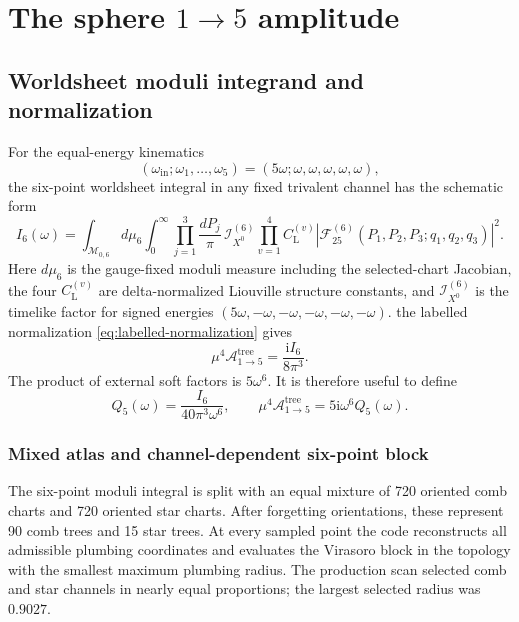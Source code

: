 \documentclass[11pt]{article}
\newcommand{\ii}{\mathrm{i}}
\newcommand{\A}{\mathcal{A}}
\begin{document}
\section{The sphere \texorpdfstring{$1\to5$}{1 to 5} amplitude}
\label{sec:one-to-five}

\subsection{Worldsheet moduli integrand and normalization}

For the equal-energy kinematics
\begin{equation}
  (\omega_{\mathrm{in}};\omega_1,\ldots,\omega_5)
  =(5\omega;\omega,\omega,\omega,\omega,\omega),
\end{equation}
the six-point worldsheet integral in any fixed trivalent channel has the
schematic form
\begin{equation}
  I_6(\omega)=\int_{\mathcal M_{0,6}}d\mu_6
      \int_0^\infty\prod_{j=1}^{3}\frac{dP_j}{\pi}\,
      \mathcal I_{X^0}^{(6)}
      \prod_{v=1}^{4}C_{\mathrm L}^{(v)}
      \left|\mathcal F_{25}^{(6)}
      (P_1,P_2,P_3;q_1,q_2,q_3)\right|^2.
  \label{eq:I6-schematic}
\end{equation}
Here $d\mu_6$ is the gauge-fixed moduli measure including the selected-chart
Jacobian, the four $C_{\mathrm L}^{(v)}$ are delta-normalized Liouville
structure constants, and $\mathcal I_{X^0}^{(6)}$ is the timelike factor for
signed energies $(5\omega,-\omega,-\omega,-\omega,-\omega,-\omega)$.
the labelled normalization \eqref{eq:labelled-normalization} gives
\begin{equation}
  \mu^4\A^{\mathrm{tree}}_{1\to5}
  =\frac{\ii I_6}{8\pi^3}.
  \label{eq:A15-I6}
\end{equation}
The product of external soft factors is $5\omega^6$.  It is therefore useful
to define
\begin{equation}
  Q_5(\omega)=\frac{I_6}{40\pi^3\omega^6},
  \qquad
  \mu^4\A^{\mathrm{tree}}_{1\to5}
  =5\ii\omega^6Q_5(\omega).
  \label{eq:define-Q5}
\end{equation}

\subsubsection{Mixed atlas and channel-dependent six-point block}

The six-point moduli integral is split with an equal mixture of 720 oriented
comb charts and 720 oriented star charts.  After forgetting orientations,
these represent 90 comb trees and 15 star trees.  At every sampled point the
code reconstructs all admissible plumbing coordinates and evaluates the
Virasoro block in the topology with the smallest maximum plumbing radius.
The production scan selected comb and star channels in nearly equal
proportions; the largest selected radius was $0.9027$.
\end{document}
